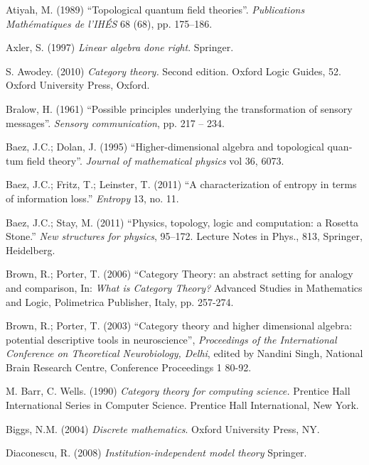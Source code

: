 \documentclass[a4paper]{book}
\def\rr{\raggedright}
\theoremstyle{myth}
\begin{document}
\begin{english}


\begin{thebibliography}{SGWB}\rr

 Atiyah, M. (1989) “Topological quantum field theories”. {\em Publications Math\'{e}matiques de l'IH\'{E}S} 68 (68), pp. 175--186.

 Axler, S. (1997) {\em Linear algebra done right}. Springer. 

 S. Awodey. (2010) {\em Category theory.} Second edition. Oxford Logic Guides, 52. Oxford University Press, Oxford.

 Bralow, H. (1961) “Possible principles underlying the transformation of sensory messages”. {\em Sensory communication}, pp. 217 -- 234.

 Baez, J.C.; Dolan, J. (1995) “Higher-dimensional algebra and topological quantum field theory”. {\em Journal of mathematical physics} vol 36, 6073.

 Baez, J.C.; Fritz, T.; Leinster, T. (2011) “A characterization of entropy in terms of information loss.” {\em Entropy} 13, no. 11.

 Baez, J.C.; Stay, M. (2011) “Physics, topology, logic and computation: a Rosetta Stone.” {\em New structures for physics}, 95–172. Lecture Notes in Phys., 813, Springer, Heidelberg.

 Brown, R.; Porter, T. (2006) “Category Theory: an abstract setting for
analogy and comparison, In: {\em What is Category Theory?} Advanced
Studies in Mathematics and Logic, Polimetrica Publisher, Italy, pp. 257-274.

 Brown, R.; Porter, T. (2003) “Category theory and higher dimensional
algebra: potential descriptive tools in neuroscience”, {\em Proceedings
of the International Conference on Theoretical Neurobiology, Delhi}, edited by Nandini Singh, National Brain Research
Centre, Conference Proceedings 1 80-92. 

 M. Barr, C. Wells. (1990) {\em Category theory for computing science.} Prentice Hall International Series in Computer Science. Prentice Hall International, New York.

 Biggs, N.M. (2004) {\em Discrete mathematics}. Oxford University Press, NY. 

 Diaconescu, R. (2008) {\em Institution-independent model theory} Springer.


\end{thebibliography}
\end{english}
\end{document}
